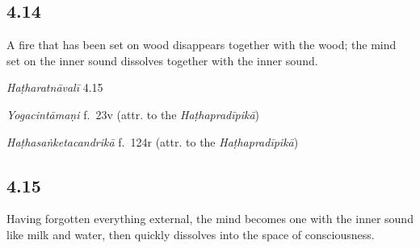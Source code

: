\begin{ekdosis}
\subsection*{4.14}
\begin{translation}[hp04_011]
A fire that has been set on wood disappears together with the wood; the mind set on the inner sound dissolves together with the inner sound.
\end{translation}


\begin{testimonia}[hp04_011]
\emph{Haṭharatnāvalī} 4.15
\begin{versinnote}
\end{versinnote}

\emph{Yogacintāmaṇi} f.~23v (attr. to the \emph{Haṭhapradīpikā})
\begin{versinnote}
\end{versinnote}

\emph{Haṭhasaṅketacandrikā} f.~124r (attr. to the \emph{Haṭhapradīpikā})
\begin{versinnote}
\end{versinnote}
\end{testimonia}


\subsection*{4.15}
\begin{translation}[hp04_012]
Having forgotten everything external, the mind becomes one with the inner sound like milk and water, then quickly dissolves into the space of consciousness.
\end{translation}


\end{ekdosis}
